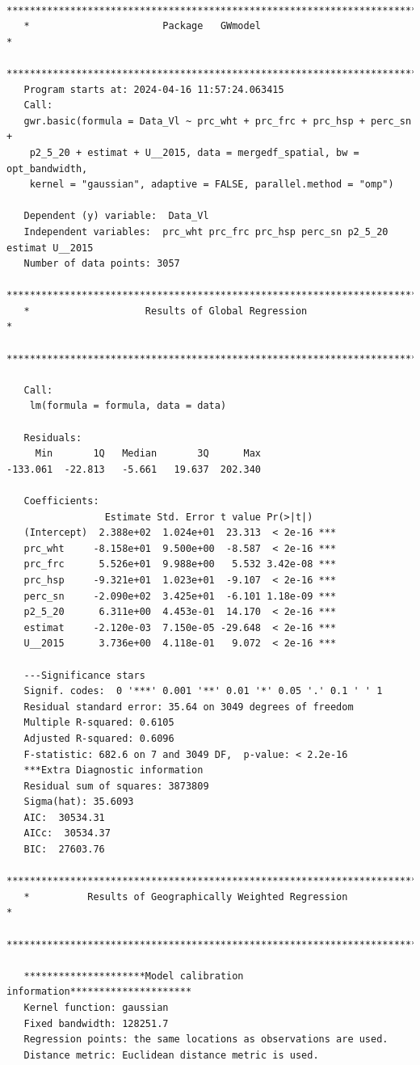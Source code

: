 \documentclass[
]{article}
\begin{document}
\begin{verbatim}
   ***********************************************************************
   *                       Package   GWmodel                             *
   ***********************************************************************
   Program starts at: 2024-04-16 11:57:24.063415 
   Call:
   gwr.basic(formula = Data_Vl ~ prc_wht + prc_frc + prc_hsp + perc_sn + 
    p2_5_20 + estimat + U__2015, data = mergedf_spatial, bw = opt_bandwidth, 
    kernel = "gaussian", adaptive = FALSE, parallel.method = "omp")

   Dependent (y) variable:  Data_Vl
   Independent variables:  prc_wht prc_frc prc_hsp perc_sn p2_5_20 estimat U__2015
   Number of data points: 3057
   ***********************************************************************
   *                    Results of Global Regression                     *
   ***********************************************************************

   Call:
    lm(formula = formula, data = data)

   Residuals:
     Min       1Q   Median       3Q      Max 
-133.061  -22.813   -5.661   19.637  202.340 

   Coefficients:
                 Estimate Std. Error t value Pr(>|t|)    
   (Intercept)  2.388e+02  1.024e+01  23.313  < 2e-16 ***
   prc_wht     -8.158e+01  9.500e+00  -8.587  < 2e-16 ***
   prc_frc      5.526e+01  9.988e+00   5.532 3.42e-08 ***
   prc_hsp     -9.321e+01  1.023e+01  -9.107  < 2e-16 ***
   perc_sn     -2.090e+02  3.425e+01  -6.101 1.18e-09 ***
   p2_5_20      6.311e+00  4.453e-01  14.170  < 2e-16 ***
   estimat     -2.120e-03  7.150e-05 -29.648  < 2e-16 ***
   U__2015      3.736e+00  4.118e-01   9.072  < 2e-16 ***

   ---Significance stars
   Signif. codes:  0 '***' 0.001 '**' 0.01 '*' 0.05 '.' 0.1 ' ' 1 
   Residual standard error: 35.64 on 3049 degrees of freedom
   Multiple R-squared: 0.6105
   Adjusted R-squared: 0.6096 
   F-statistic: 682.6 on 7 and 3049 DF,  p-value: < 2.2e-16 
   ***Extra Diagnostic information
   Residual sum of squares: 3873809
   Sigma(hat): 35.6093
   AIC:  30534.31
   AICc:  30534.37
   BIC:  27603.76
   ***********************************************************************
   *          Results of Geographically Weighted Regression              *
   ***********************************************************************

   *********************Model calibration information*********************
   Kernel function: gaussian 
   Fixed bandwidth: 128251.7 
   Regression points: the same locations as observations are used.
   Distance metric: Euclidean distance metric is used.


\end{verbatim}
\end{document}
